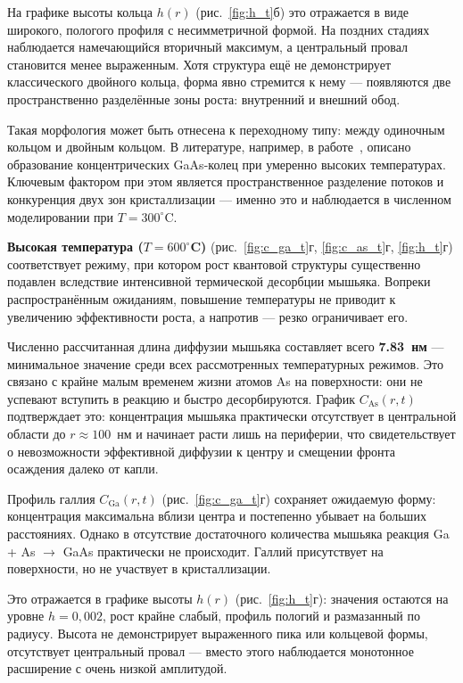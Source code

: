 \documentclass[14pt,oneside]{extarticle}
\begin{document}
На графике высоты кольца $h(r)$ (рис.~\ref{fig:h_t}б) это отражается в виде широкого, пологого профиля с несимметричной формой. На поздних стадиях наблюдается намечающийся вторичный максимум, а центральный провал становится менее выраженным. Хотя структура ещё не демонстрирует классического двойного кольца, форма явно стремится к нему — появляются две пространственно разделённые зоны роста: внутренний и внешний обод.

Такая морфология может быть отнесена к переходному типу: между одиночным кольцом и двойным кольцом. В литературе, например, в работе~\cite{mano2005nano}, описано образование концентрических GaAs-колец при умеренно высоких температурах. Ключевым фактором при этом является пространственное разделение потоков и конкуренция двух зон кристаллизации — именно это и наблюдается в численном моделировании при $T = 300^\circ$C.

\textbf{Высокая температура ($T = 600^\circ$C)} (рис.~\ref{fig:c_ga_t}г, \ref{fig:c_as_t}г, \ref{fig:h_t}г) соответствует режиму, при котором рост квантовой структуры существенно подавлен вследствие интенсивной термической десорбции мышьяка. Вопреки распространённым ожиданиям, повышение температуры не приводит к увеличению эффективности роста, а напротив — резко ограничивает его.

Численно рассчитанная длина диффузии мышьяка составляет всего \textbf{7.83~нм} — минимальное значение среди всех рассмотренных температурных режимов. Это связано с крайне малым временем жизни атомов As на поверхности: они не успевают вступить в реакцию и быстро десорбируются. График $C_{\text{As}}(r, t)$ подтверждает это: концентрация мышьяка практически отсутствует в центральной области до $r \approx 100$~нм и начинает расти лишь на периферии, что свидетельствует о невозможности эффективной диффузии к центру и смещении фронта осаждения далеко от капли.

Профиль галлия $C_{\text{Ga}}(r, t)$ (рис.~\ref{fig:c_ga_t}г) сохраняет ожидаемую форму: концентрация максимальна вблизи центра и постепенно убывает на больших расстояниях. Однако в отсутствие достаточного количества мышьяка реакция Ga + As $\rightarrow$ GaAs практически не происходит. Галлий присутствует на поверхности, но не участвует в кристаллизации.

Это отражается в графике высоты $h(r)$ (рис.~\ref{fig:h_t}г): значения остаются на уровне $h = 0{,}002$, рост крайне слабый, профиль пологий и размазанный по радиусу. Высота не демонстрирует выраженного пика или кольцевой формы, отсутствует центральный провал — вместо этого наблюдается монотонное расширение с очень низкой амплитудой.
\end{document}
